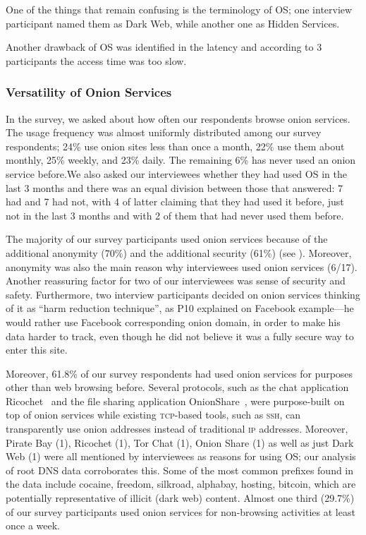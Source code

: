 One of the things that remain confusing is the terminology of OS; one interview
participant named them as Dark Web, while another one as Hidden Services.

Another drawback of OS was identified in the latency and according to 3
participants the access time was too slow.

\subsubsection{Versatility of Onion Services }

In the survey, we asked about how often our respondents browse onion services.
The usage frequency was almost uniformly distributed among our survey
respondents; 24\% use onion sites less than once a month, 22\% use them about
monthly, 25\% weekly, and 23\% daily.  The remaining 6\% has never used an onion
service before.We also asked our interviewees whether they had used OS in the
last 3 months and there was an equal division between those that answered: 7 had
and 7 had not, with 4 of latter claiming that they had used it before, just not
in the last 3 months and with 2 of them that had never used them before.

The majority of our survey participants  used onion services because of the
additional anonymity (70\%) and the additional security (61\%) (see
). Moreover,  anonymity was also the main reason why
interviewees used onion services (6/17). Another reassuring factor for two of
our interviewees was sense of security and safety. Furthermore, two interview
participants decided on onion services thinking of it as ``harm reduction
technique'', as P10 explained on Facebook example---he would rather use Facebook
corresponding onion domain, in order to make his data harder to track, even
though he did not believe it was a fully secure way to enter this site.

Moreover, 61.8\% of our survey respondents had used onion services for purposes
other than web browsing before.  Several protocols, such as the chat application
Ricochet~\cite{ricochet} and the file sharing application
OnionShare~\cite{onionshare}, were purpose-built on top of onion services while
existing \textsc{tcp}-based tools, such as \textsc{ssh}, can transparently use
onion addresses instead of traditional \textsc{ip} addresses.  Moreover, Pirate
Bay (1), Ricochet (1), Tor Chat (1), Onion Share (1) as well as just Dark Web
(1) were all mentioned by interviewees as reasons for using OS; our analysis of
root DNS data corroborates this.  Some of the most common prefixes found in the
data include cocaine, freedom, silkroad, alphabay, hosting, bitcoin, which are
potentially representative of illicit (dark web) content. Almost one third
(29.7\%) of our survey participants used onion services for non-browsing
activities at least once a week. 

